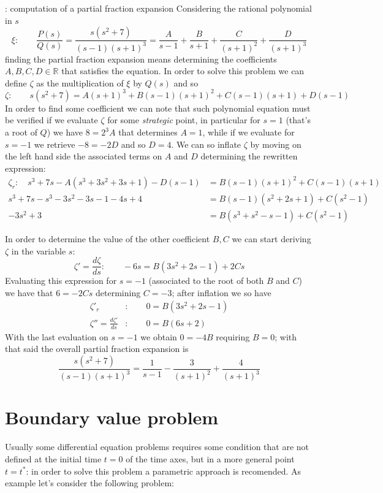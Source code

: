 	\begin{example}{: computation of a partial fraction expansion}
		Considering the rational polynomial in $s$
		\[ \xi: \qquad \frac{P(s)}{Q(s)} = \frac{s(s^2+7)}{(s-1)(s+1)^3} = \frac A {s-1} + \frac B {s+1} + \frac C{(s+1)^2} + \frac D{(s+1)^3} \]
		finding the partial fraction expansion means determining the coefficients $A,B,C,D \in \mathds R$ that satisfies the equation. In order to solve this problem we can define $\zeta$ as the multiplication of $\xi$ by $Q(s)$ and so
		\[ \zeta: \qquad s(s^2+7) = A (s+1)^3 + B (s-1)(s+1)^2 + C (s-1)(s+1) + D (s-1) \]
		In order to find some coefficient we can note that such polynomial equation must be verified if we evaluate $\zeta$ for some \textit{strategic} point, in particular for $s = 1$ (that's a root of $Q$) we have $8 = 2^3 A$ that determines $A=1$, while if we evaluate for $s = -1$ we retrieve $-8 = -2D$ and so $D=4$. We can so inflate $\zeta$ by moving on the left hand side the associated terms on $A$ and $D$ determining the rewritten expression:
		\begin{align*}
			\zeta_r: \quad s^3 + 7s - A (s^3 + 3s^2 + 3s + 1) - D(s-1) & = B (s-1)(s+1)^2 + C (s-1)(s+1) \\
			s^3 + 7s -s^3 -3s^2 - 3s - 1 -4s + 4  & = B (s-1)(s^2+2s +1) + C (s^2-1) \\
			-3s^2 + 3 & = B (s^3 + s^2 -s - 1) + C(s^2-1)
		\end{align*}
		
		In order to determine the value of the other coefficient $B,C$ we can start deriving $\zeta$ in the variable $s$:
		\[ \zeta' = \frac{d \zeta}{ds}: \qquad -6s = B(3s^2 + 2s -1) + 2Cs \]
		Evaluating this expression for $s = -1$ (associated to the root of both $B$ and $C$) we have that $6 = -2 C s$ determining $C=-3$; after inflation we so have
		\begin{align*} 
			\zeta'_r&: \qquad 0 = B (3s^2+2s-1) \\
			\zeta'' = \frac{d\zeta'}{ds}&: \qquad 0 = B(6s + 2)
		\end{align*}
		With the last evaluation on $s=-1$ we obtain $0 = -4B$ requiring $B=0$; with that said the overall partial fraction expansion is
		\[ \frac{s(s^2+7)}{(s-1)(s+1)^3} = \frac 1 {s-1} - \frac 3{(s+1)^2} + \frac 4{(s+1)^3} \]
	\end{example}

\section{Boundary value problem}
	Usually some differential equation problems requires some condition that are not defined at the initial time $t=0$ of the time axes, but in a more general point $t=t^*$: in order to solve this problem a parametric approach is recomended. As example let's consider the following problem:
	
